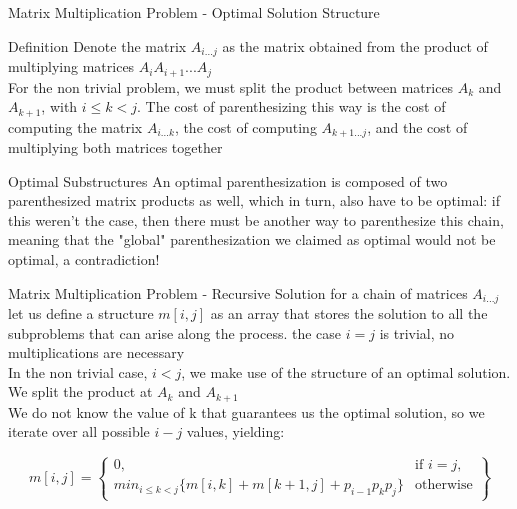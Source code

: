 \begin{frame}{Matrix Multiplication Problem - Optimal Solution Structure}
  \begin{block}{Definition}
   Denote the matrix $A_{i...j}$ as the matrix obtained from the product
   of multiplying matrices $A_{i}A_{i+1}...A_{j}$ \\
  \vspace{0.5em}
  For the non trivial problem, we must split the product between matrices $A_k$ and $A_{k+1}$,
  with $ i \leq k < j$. The cost of parenthesizing this way is the cost
  of computing the matrix $A_{i...k}$, the cost of computing $A_{k+1...j}$,
  and the cost of multiplying both matrices together
  \end{block}

  \pause
  \begin{alertblock}{Optimal Substructures}
    An optimal parenthesization is composed of two parenthesized matrix products as well,
    which in turn, also have to be optimal: if this weren't the case, then there must be another
    way to parenthesize this chain, meaning that the "global" parenthesization we claimed as optimal would not
    be optimal, a contradiction!
  \end{alertblock}
\end{frame}

\begin{frame}{Matrix Multiplication Problem - Recursive Solution}
  for a chain of matrices $A_{i...j}$ let us define a structure $m[i, j]$ as an array
  that stores the solution to all the subproblems that can arise
  along the process.
  \vspace{0.5em}
  the case $i = j$ is trivial, no multiplications are necessary %
  \\
  In the non trivial case, $i < j$, we make use of the structure of an optimal solution.
  We split the product at  $A_k$ and $A_{k+1}$
  \vspace{0.5em}
  \\
  We do not know the value of k that guarantees us the optimal solution, so we iterate over
  all possible $i - j$ values, yielding:   

  \[
  m[i,j] = \left\{\begin{array}{lr}
    0, & \text{if } i = j,\\
    min_{i \leq k < j} \{m[i,k] + m[k + 1, j] + p_{i-1}p_{k}p_{j}\} & \text{otherwise}
    \end{array}\right\}
  \]
\end{frame}

